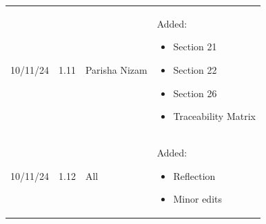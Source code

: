 \documentclass[12pt]{article}
\begin{document}
\begin{table}[H]
\begin{tabularx}{\textwidth}{p{1.5cm} p{1cm} p{3.5cm} X}
      10/11/24 & 1.11 & Parisha Nizam & Added:
      \begin{itemize}[leftmargin=*]
        \item Section 21
        \item Section 22
        \item Section 26
        \item Traceability Matrix
      \end{itemize} \\
      10/11/24 & 1.12 & All & Added:
      \begin{itemize}[leftmargin=*]
        \item Reflection
        \item Minor edits
      \end{itemize} \\
  \end{tabularx}
\end{table}

\newpage
\end{document}
